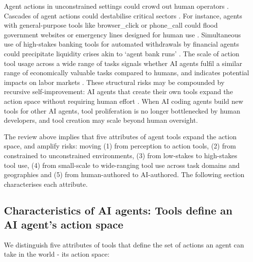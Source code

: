 \documentclass[manuscript,screen,nonacm,oneside]{acmart}
\begin{document}
Agent actions in unconstrained settings could crowd out human operators \citep{ibrahim2025measuring}. Cascades of agent actions could destabilise critical sectors \citep{ibrahim2025measuring,deng2025ai}. For instance, agents with general-purpose tools like browser\_click or phone\_call could flood government websites or emergency lines designed for human use \citep{kulveit2025gradual}.
Simultaneous use of high-stakes banking tools for automated withdrawals by financial agents could precipitate liquidity crises akin to `agent bank runs' \citep{ALDASORO2025101472,danielsson2025artificialintelligencefinancialcrises}. The scale of action tool usage across a wide range of tasks signals whether AI agents fulfil a similar range of economically valuable tasks compared to humans, and indicates potential impacts on labor markets \citep{motwani2024secret, chan2023harms, shao2025future}.
These structural risks may be compounded by recursive self-improvement: AI agents that create their own tools expand the action space without requiring human effort \citep{ishibashi-etal-2025-large, Barrett_2016, zhang2025darwingodelmachineopenended}. When AI coding agents build new tools for other AI agents, tool proliferation is no longer bottlenecked by human developers, and tool creation may scale beyond human oversight.

The review above implies that five attributes of agent tools expand the action space, and amplify risks: moving (1) from perception to action tools, (2) from constrained to unconstrained environments, (3) from low-stakes to high-stakes tool use, (4) from small-scale to wide-ranging tool use across task domains and geographies and (5) from human-authored to AI-authored. The following section characterises each attribute. 

\subsection{Characteristics of AI agents: Tools define an AI agent's action space}
\label{sec:characteristics}
We distinguish five attributes of tools that define the set of actions an agent can take in the world - its action space:
\end{document}
